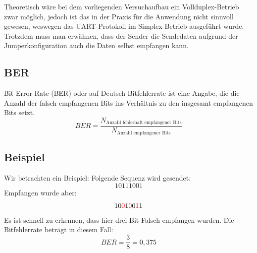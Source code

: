 Theoretisch wäre bei dem vorliegenden Versuchaufbau ein Vollduplex-Betrieb zwar möglich, jedoch ist das in der Praxis für die Anwendung nicht sinnvoll gewesen, weswegen das UART-Protokoll im Simplex-Betrieb ausgeführt wurde.
Trotzdem muss man erwähnen, dass der Sender die Sendedaten aufgrund der Jumperkonfiguration auch die Daten selbst empfangen kann.

\subsection{BER}
Bit Error Rate (BER) oder auf Deutsch Bitfehlerrate ist eine Angabe, die die
Anzahl der falsch empfangenen Bits ins Verhältnis zu den insgesamt empfangenen Bits setzt.
\begin{equation}
    BER = \frac{N_{\text{Anzahl fehlerhaft empfangener Bits}}}{N_{\text{Anzahl empfangener Bits}}}
\end{equation}
\subsection{Beispiel}
Wir betrachten ein Beispiel: Folgende Sequenz wird gesendet:
\begin{equation}
    10111001
\end{equation}
Empfangen wurde aber:
\begin{equation}
      10\textcolor{red}{0}1\textcolor{red}{0}0\textcolor{red}{1}1
\end{equation}
Es ist schnell zu erkennen, dass hier drei Bit Falsch empfangen  wurden.
Die Bitfehlerrate beträgt in diesem Fall:
\begin{equation}
    BER = \frac{3}{8} = 0,375
\end{equation}
